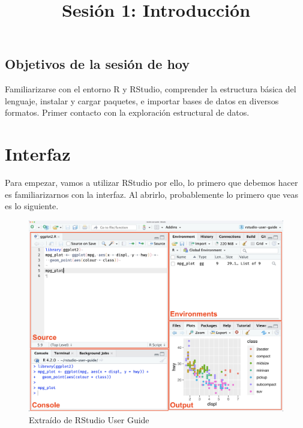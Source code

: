 \documentclass[
  letterpaper,
  DIV=11,
  numbers=noendperiod,
  twoside]{scrreprt}
\title{Sesión 1: Introducción}
\author{}
\date{}
\renewcommand*\contentsname{Tabla de contenidos}
\newcommand\contentsname{Tabla de contenidos}
\begin{document}
\maketitle

\renewcommand*\contentsname{Tabla de contenidos}
{
\hypersetup{linkcolor=}
\setcounter{tocdepth}{2}
\tableofcontents
}

\newpage

\section{Objetivos de la sesión de
hoy}\label{objetivos-de-la-sesiuxf3n-de-hoy}

Familiarizarse con el entorno R y RStudio, comprender la estructura
básica del lenguaje, instalar y cargar paquetes, e importar bases de
datos en diversos formatos. Primer contacto con la exploración
estructural de datos.

\chapter{Interfaz}\label{interfaz}

\newpage

Para empezar, vamos a utilizar RStudio por ello, lo primero que debemos
hacer es familiarizarnos con la interfaz. Al abrirlo, probablemente lo
primero que veas es lo siguiente.

\begin{figure}[H]

{\centering \includegraphics[width=5.125in,height=\textheight]{images/clipboard-2730531706.png}

}

\caption{Extraído de RStudio User Guide}

\end{figure}%
\end{document}
